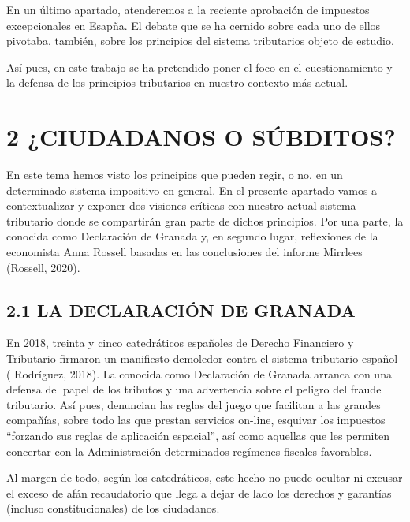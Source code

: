 \documentclass[
]{article}
\begin{document}
En un último apartado, atenderemos a la reciente aprobación de impuestos
excepcionales en Esapña. El debate que se ha cernido sobre cada uno de
ellos pivotaba, también, sobre los principios del sistema tributarios
objeto de estudio.

Así pues, en este trabajo se ha pretendido poner el foco en el
cuestionamiento y la defensa de los principios tributarios en nuestro
contexto más actual.

\hypertarget{ciudadanos-o-suxfabditos}{%
\section*{2 ¿CIUDADANOS O SÚBDITOS?}\label{ciudadanos-o-suxfabditos}}

En este tema hemos visto los principios que pueden regir, o no, en un
determinado sistema impositivo en general. En el presente apartado vamos
a contextualizar y exponer dos visiones críticas con nuestro actual
sistema tributario donde se compartirán gran parte de dichos principios.
Por una parte, la conocida como Declaración de Granada y, en segundo
lugar, reflexiones de la economista Anna Rossell basadas en las
conclusiones del informe Mirrlees (Rossell, 2020).

\hypertarget{la-declaraciuxf3n-de-granada}{%
\subsection*{2.1 LA DECLARACIÓN DE
GRANADA}\label{la-declaraciuxf3n-de-granada}}

En 2018, treinta y cinco catedráticos españoles de Derecho Financiero y
Tributario firmaron un manifiesto demoledor contra el sistema tributario
español ( Rodríguez, 2018). La conocida como Declaración de Granada
arranca con una defensa del papel de los tributos y una advertencia
sobre el peligro del fraude tributario. Así pues, denuncian las reglas
del juego que facilitan a las grandes compañías, sobre todo las que
prestan servicios on-line, esquivar los impuestos ``forzando sus reglas
de aplicación espacial'', así como aquellas que les permiten concertar
con la Administración determinados regímenes fiscales favorables.

Al margen de todo, según los catedráticos, este hecho no puede ocultar
ni excusar el exceso de afán recaudatorio que llega a dejar de lado los
derechos y garantías (incluso constitucionales) de los ciudadanos.
\end{document}
